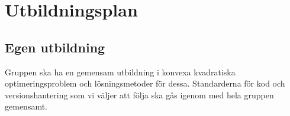 \section{Utbildningsplan}

\subsection{Egen utbildning}
Gruppen ska ha en gemensam utbildning i konvexa kvadratiska optimeringsproblem och lösningsmetoder för dessa. Standarderna för kod och versionshantering som vi väljer att följa ska gås igenom med hela gruppen gemensamt. 